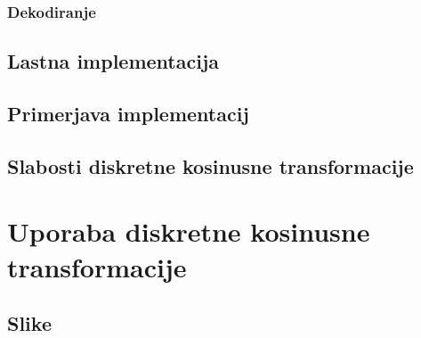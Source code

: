 \documentclass[a4paper,12pt,openright]{book}
\begin{document}

\subsection{Dekodiranje}


\section{Lastna implementacija}

\section{Primerjava implementacij}

\section{Slabosti diskretne kosinusne transformacije}


\chapter{Uporaba diskretne kosinusne transformacije}
\label{ch1}

\section{Slike}





%
%
\printbibliography[heading=bibintoc,title={Literatura}]
\end{document}
